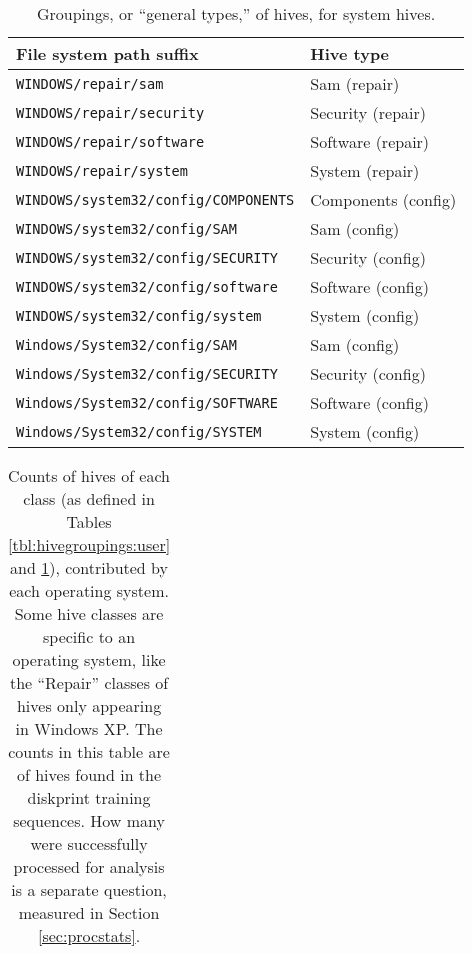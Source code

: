 \documentclass[11pt]{ucthesis}
\theoremstyle{plain}
\theoremstyle{definition}
\begin{document}
\begin{table}[htp]
\caption{Groupings, or ``general types,'' of hives, for system hives.}
\begin{center}
\begin{small}
\begin{tabular}{p{}p{}}
\toprule
File system path suffix & Hive type \\
\midrule
\texttt{WINDOWS/repair/sam} & Sam (repair) \\
\texttt{WINDOWS/repair/security} & Security (repair) \\
\texttt{WINDOWS/repair/software} & Software (repair) \\
\texttt{WINDOWS/repair/system} & System (repair) \\
\texttt{WINDOWS/system32/config/COMPONENTS} & Components (config) \\
\texttt{WINDOWS/system32/config/SAM} & Sam (config) \\
\texttt{WINDOWS/system32/config/SECURITY} & Security (config) \\
\texttt{WINDOWS/system32/config/software} & Software (config) \\
\texttt{WINDOWS/system32/config/system} & System (config) \\
\texttt{Windows/System32/config/SAM} & Sam (config) \\
\texttt{Windows/System32/config/SECURITY} & Security (config) \\
\texttt{Windows/System32/config/SOFTWARE} & Software (config) \\
\texttt{Windows/System32/config/SYSTEM} & System (config) \\
\bottomrule
\end{tabular}
\end{small}
\end{center}
\label{tbl:hivegroupings:system}
\end{table}%

\begin{table}[htp]
\caption{Counts of hives of each class (as defined in Tables \ref{tbl:hivegroupings:user} and \ref{tbl:hivegroupings:system}), contributed by each operating system.  Some hive classes are specific to an operating system, like the ``Repair'' classes of hives only appearing in Windows XP.  The counts in this table are of hives found in the diskprint training sequences.  How many were successfully processed for analysis is a separate question, measured in Section \ref{sec:procstats}.}
\begin{small}
\begin{center}
\begin{tabular}{lrrrrrrr}
\toprule

\bottomrule
\end{tabular}
\end{center}
\end{small}
\label{tbl:hiveclasscontributions}
\end{table}
\end{document}
